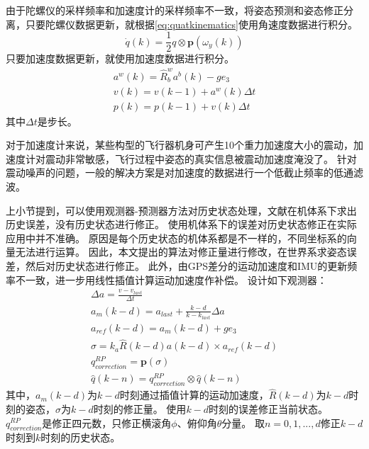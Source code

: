 \documentclass[
  type=master
]{gdutthesis}
\begin{document}
由于陀螺仪的采样频率和加速度计的采样频率不一致，将姿态预测和姿态修正分离，只要陀螺仪数据更新，就根据\autoref{eq:quatkinematics}使用角速度数据进行积分。
\begin{equation}\label{eq:quatint}
	\dot{q}(k)=\frac{1}{2} q \otimes \mathbf{p}(\omega_y(k))
\end{equation}
\vspace{1ex}只要加速度数据更新，就使用加速度数据进行积分。
\begin{gather}\label{eq:pvpredict}
		a^w(k) = \hat{R}_b^w a^b(k) - g e_3\\
		v(k) = v(k-1) + a^w(k) \Delta t\\
		p(k) = p(k-1) + v(k) \Delta t 
\end{gather}
其中$\Delta t$是步长。

对于加速度计来说，某些构型的飞行器机身可产生10个重力加速度大小的震动，加速度计对震动非常敏感，飞行过程中姿态的真实信息被震动加速度淹没了。
针对震动噪声的问题，一般的解决方案是对加速度的数据进行一个低截止频率的低通滤波。

上小节提到，可以使用观测器-预测器方法对历史状态处理，文献\parencite{khosravian2014velocity}在机体系下求出历史误差，没有历史状态进行修正。
使用机体系下的误差对历史状态修正在实际应用中并不准确。
原因是每个历史状态的机体系都是不一样的，不同坐标系的向量无法进行运算。
因此，本文提出的算法对修正量进行修改，在世界系求姿态误差，然后对历史状态进行修正。
此外，由GPS差分的运动加速度和IMU的更新频率不一致，进一步用线性插值计算运动加速度作补偿。
\vspace{1ex}设计如下观测器：
\begin{gather}\label{eq:myrpcorrection}
		\Delta a = \frac{v - v_{last}}{\Delta t}\\
		a_m (k-d) = a_{last} + \frac{k-d}{k-k_{last}} \Delta a\\
		a_{ref} (k-d) = a_m (k-d) + g e_3\\
		\sigma = k_a \hat{R}(k-d) a(k-d) \times a_{ref}(k-d)\\
		q_{correction}^{RP} = \mathbf{p}(\sigma)\\
		\hat{q}(k-n) = q_{correction}^{RP} \otimes \hat{q}(k-n)
\end{gather}
其中，$a_m (k-d)$为$k-d$时刻通过插值计算的运动加速度，$\hat{R}(k-d)$为$k-d$时刻的姿态，$\sigma$为$k-d$时刻的修正量。
使用$k-d$时刻的误差修正当前状态。
$q_{correction}^{RP}$是修正四元数，只修正横滚角$\phi$、俯仰角$\theta$分量。
取$n=0,1,...,d$修正$k-d$时刻到$k$时刻的历史状态。
\end{document}
